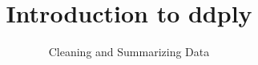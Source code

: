 \documentclass{beamer}
\title[3-Intro to ddply]{Introduction to ddply}
\subtitle{Cleaning and Summarizing Data}
\date{\hspace{1in}}
\institute[ISU]{Iowa State University}
\begin{document}
\begin{frame}
\maketitle
\end{frame}
\end{document}
